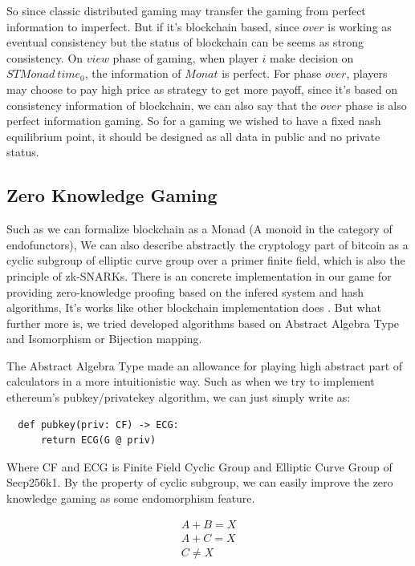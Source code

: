 \documentclass[twocolumn]{article}
\begin{document}
So since classic distributed gaming may transfer the gaming from perfect information to imperfect. But if it's blockchain based, since $over$ is working as eventual consistency\cite{consis} but the status of blockchain can be seems as strong consistency\cite {Consistent}. On $view$ phase of gaming, when player $i$ make decision on $STMonad \  time_0$, the information of $Monat$ is perfect. For phase $over$, players may choose to pay high price as strategy to get more payoff, since it's based on consistency information of blockchain, we can also say that the $over$ phase is also perfect information gaming. So for a gaming we wished to have a fixed nash equilibrium point, it should be designed as all data in public and no private status.

\subsection {Zero Knowledge Gaming}

Such as we can formalize blockchain as a Monad (A monoid in the category of endofunctors), We can also describe abstractly the cryptology part of bitcoin as a cyclic subgroup of elliptic curve group over a primer finite field, which is also the principle of zk-SNARKs. There is an concrete implementation in our game for providing zero-knowledge proofing based on the infered system and hash algorithms, It's works like other blockchain implementation does \cite{zcash}. But what further more is, we tried developed algorithms based on Abstract Algebra Type and Isomorphism or Bijection mapping.

The Abstract Algebra Type made an allowance for playing high abstract part of calculators in a more intuitionistic way. Such as when we try to implement ethereum's pubkey/privatekey algorithm, we can just simply write as\cite{klefki}:

\lstset{language=Python}
\begin{lstlisting}
  def pubkey(priv: CF) -> ECG:
      return ECG(G @ priv)
\end{lstlisting}

Where CF and ECG is Finite Field Cyclic Group and Elliptic Curve Group of Secp256k1. By the property of cyclic subgroup, we can easily improve the zero knowledge gaming as some endomorphism feature.

\begin{gather}
  A + B = X \\
  A + C = X \\
  C \neq X
\end{gather}
\end{document}
